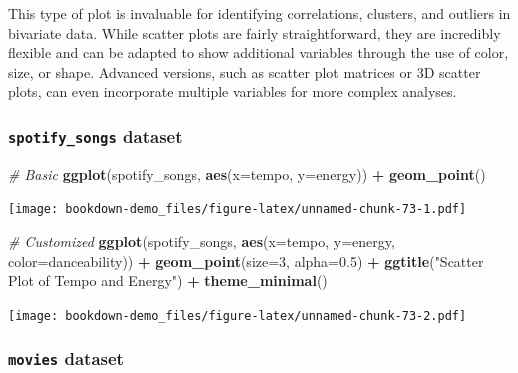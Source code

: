 \documentclass[
  b5paper]{book}
\newenvironment{Shaded}{\begin{snugshade}}{\end{snugshade}}
\newcommand{\AttributeTok}[1]{\textcolor[rgb]{0.13,0.29,0.53}{#1}}
\newcommand{\CommentTok}[1]{\textcolor[rgb]{0.56,0.35,0.01}{\textit{#1}}}
\newcommand{\DecValTok}[1]{\textcolor[rgb]{0.00,0.00,0.81}{#1}}
\newcommand{\FloatTok}[1]{\textcolor[rgb]{0.00,0.00,0.81}{#1}}
\newcommand{\FunctionTok}[1]{\textcolor[rgb]{0.13,0.29,0.53}{\textbf{#1}}}
\newcommand{\NormalTok}[1]{#1}
\newcommand{\SpecialCharTok}[1]{\textcolor[rgb]{0.81,0.36,0.00}{\textbf{#1}}}
\newcommand{\StringTok}[1]{\textcolor[rgb]{0.31,0.60,0.02}{#1}}
\begin{document}
This type of plot is invaluable for identifying correlations, clusters, and outliers in bivariate data. While scatter plots are fairly straightforward, they are incredibly flexible and can be adapted to show additional variables through the use of color, size, or shape. Advanced versions, such as scatter plot matrices or 3D scatter plots, can even incorporate multiple variables for more complex analyses.

\hypertarget{spotify_songs-dataset}{%
\subsubsection*{\texorpdfstring{\texttt{spotify\_songs} dataset}{spotify\_songs dataset}}\label{spotify_songs-dataset}}

\begin{Shaded}
\begin{Highlighting}[]
\CommentTok{\# Basic}
\FunctionTok{ggplot}\NormalTok{(spotify\_songs, }\FunctionTok{aes}\NormalTok{(}\AttributeTok{x=}\NormalTok{tempo, }\AttributeTok{y=}\NormalTok{energy)) }\SpecialCharTok{+} \FunctionTok{geom\_point}\NormalTok{()}
\end{Highlighting}
\end{Shaded}

\texttt{[image: bookdown-demo\_files/figure-latex/unnamed-chunk-73-1.pdf]}

\begin{Shaded}
\begin{Highlighting}[]
\CommentTok{\# Customized}
\FunctionTok{ggplot}\NormalTok{(spotify\_songs, }\FunctionTok{aes}\NormalTok{(}\AttributeTok{x=}\NormalTok{tempo, }\AttributeTok{y=}\NormalTok{energy, }\AttributeTok{color=}\NormalTok{danceability)) }\SpecialCharTok{+}
  \FunctionTok{geom\_point}\NormalTok{(}\AttributeTok{size=}\DecValTok{3}\NormalTok{, }\AttributeTok{alpha=}\FloatTok{0.5}\NormalTok{) }\SpecialCharTok{+}
  \FunctionTok{ggtitle}\NormalTok{(}\StringTok{"Scatter Plot of Tempo and Energy"}\NormalTok{) }\SpecialCharTok{+}
  \FunctionTok{theme\_minimal}\NormalTok{()}
\end{Highlighting}
\end{Shaded}

\texttt{[image: bookdown-demo\_files/figure-latex/unnamed-chunk-73-2.pdf]}

\hypertarget{movies-dataset}{%
\subsubsection*{\texorpdfstring{\texttt{movies} dataset}{movies dataset}}\label{movies-dataset}}
\end{document}
